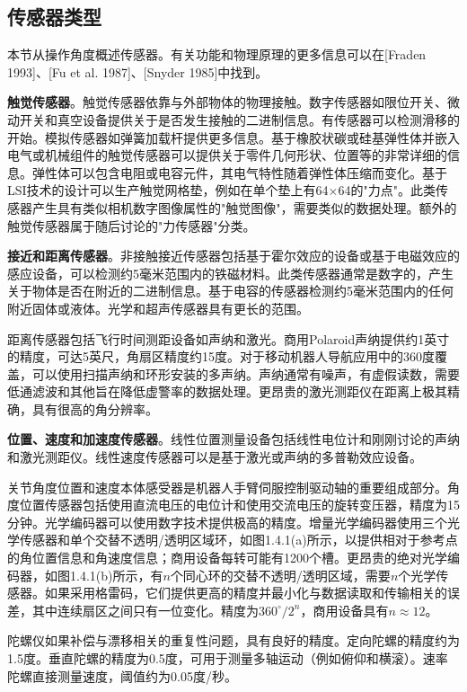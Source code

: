 \documentclass[UTF8,a4paper]{ctexart}
\begin{document}
\subsection{传感器类型}

本节从操作角度概述传感器。有关功能和物理原理的更多信息可以在[Fraden 1993]、[Fu et al. 1987]、[Snyder 1985]中找到。

\textbf{触觉传感器}。触觉传感器依靠与外部物体的物理接触。数字传感器如限位开关、微动开关和真空设备提供关于是否发生接触的二进制信息。有传感器可以检测滑移的开始。模拟传感器如弹簧加载杆提供更多信息。基于橡胶状碳或硅基弹性体并嵌入电气或机械组件的触觉传感器可以提供关于零件几何形状、位置等的非常详细的信息。弹性体可以包含电阻或电容元件，其电气特性随着弹性体压缩而变化。基于LSI技术的设计可以生产触觉网格垫，例如在单个垫上有64×64的"力点"。此类传感器产生具有类似相机数字图像属性的"触觉图像"，需要类似的数据处理。额外的触觉传感器属于随后讨论的"力传感器"分类。

\textbf{接近和距离传感器}。非接触接近传感器包括基于霍尔效应的设备或基于电磁效应的感应设备，可以检测约5毫米范围内的铁磁材料。此类传感器通常是数字的，产生关于物体是否在附近的二进制信息。基于电容的传感器检测约5毫米范围内的任何附近固体或液体。光学和超声传感器具有更长的范围。

距离传感器包括飞行时间测距设备如声纳和激光。商用Polaroid声纳提供约1英寸的精度，可达5英尺，角扇区精度约15度。对于移动机器人导航应用中的360度覆盖，可以使用扫描声纳和环形安装的多声纳。声纳通常有噪声，有虚假读数，需要低通滤波和其他旨在降低虚警率的数据处理。更昂贵的激光测距仪在距离上极其精确，具有很高的角分辨率。

\textbf{位置、速度和加速度传感器}。线性位置测量设备包括线性电位计和刚刚讨论的声纳和激光测距仪。线性速度传感器可以是基于激光或声纳的多普勒效应设备。

关节角度位置和速度本体感受器是机器人手臂伺服控制驱动轴的重要组成部分。角度位置传感器包括使用直流电压的电位计和使用交流电压的旋转变压器，精度为15分钟。光学编码器可以使用数字技术提供极高的精度。增量光学编码器使用三个光学传感器和单个交替不透明/透明区域环，如图1.4.1(a)所示，以提供相对于参考点的角位置信息和角速度信息；商用设备每转可能有1200个槽。更昂贵的绝对光学编码器，如图1.4.1(b)所示，有$n$个同心环的交替不透明/透明区域，需要$n$个光学传感器。如果采用格雷码，它们提供更高的精度并最小化与数据读取和传输相关的误差，其中连续扇区之间只有一位变化。精度为$360^\circ/2^n$，商用设备具有$n\approx 12$。

陀螺仪如果补偿与漂移相关的重复性问题，具有良好的精度。定向陀螺的精度约为1.5度。垂直陀螺的精度为0.5度，可用于测量多轴运动（例如俯仰和横滚）。速率陀螺直接测量速度，阈值约为0.05度/秒。
\end{document}
